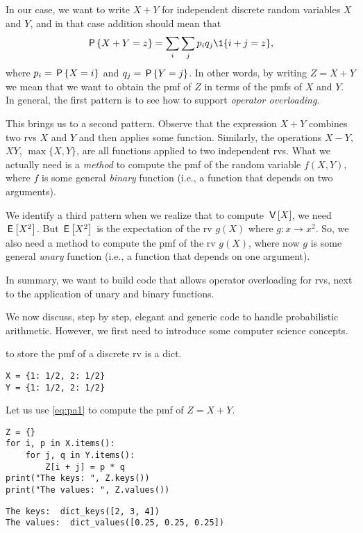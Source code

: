 \documentclass[stochastic-or]{subfiles}
\begin{document}
In our case, we want to write \(X+Y\) for independent discrete random variables \(X\) and \(Y\), and in that case addition should  mean that
\begin{equation}
\label{eq:pa1}
\P{X+Y=z} = \sum_{i} \sum_{j} p_{i} q_{j} \1{i+j=z},
\end{equation}
where \(p_{i} = \P{X=i}\) and \(q_j = \P{Y=j}\).
In other words, by writing \(Z=X+Y\) we mean that we want to obtain the pmf of \(Z\) in terms of the pmfs of \(X\) and \(Y\).
In general, the first pattern is to see how to support \emph{operator overloading}.


This brings us to a second pattern.
Observe that the expression \(X+Y\) combines two rvs \(X\) and \(Y\) and then applies some function.
Similarly, the operations \(X-Y\), \(XY\), \(\max\{X, Y\}\), are all functions applied to two independent rvs.
What we actually need is a \emph{method} to compute the pmf of the random variable \(f(X,Y)\), where \(f\) is some general \emph{binary} function (i.e., a function that depends on two arguments).

We identify a third pattern when we realize that to compute \(\V X\), we need \(\E{X^{2}}\).
But \(\E{X^{2}}\) is the expectation of the rv \(g(X)\) where \(g:x \to x^{2}\).
So, we also need a method to compute the pmf of the rv \(g(X)\), where now \(g\) is some general \emph{unary} function (i.e., a function that depends on one argument).

In summary, we want to build code  that allows operator overloading for rvs, next to the application of unary and binary functions.

We now discuss, step by step, elegant and generic code to handle probabilistic arithmetic. However, we first need to introduce some computer science concepts.


 to store the pmf of a discrete rv is a dict.
\begin{verbatim}
X = {1: 1/2, 2: 1/2}
Y = {1: 1/2, 2: 1/2}
\end{verbatim}

Let us use \cref{eq:pa1} to compute the pmf of \(Z=X+Y\).
\begin{verbatim}
Z = {}
for i, p in X.items():
    for j, q in Y.items():
        Z[i + j] = p * q
print("The keys: ", Z.keys())
print("The values: ", Z.values())
\end{verbatim}

\begin{verbatim}
The keys:  dict_keys([2, 3, 4])
The values:  dict_values([0.25, 0.25, 0.25])
\end{verbatim}
\end{document}
